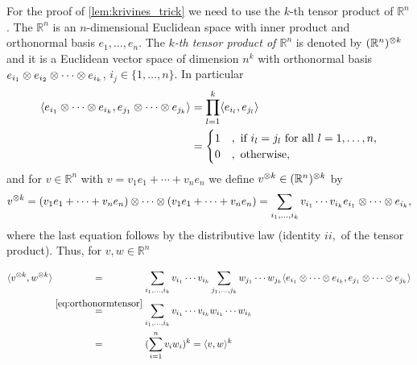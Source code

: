 \noindent For the proof of \ref{lem:krivines_trick} we need to use the $k$-th tensor product of $\mathbb{R}^n$. The $\mathbb{R}^n$ is an $n$-dimensional Euclidean space with inner product \sclr{\cdot}{\cdot} and orthonormal basis $e_1,\dots,e_n$. The \emph{$k$-th tensor product of $\mathbb{R}^n$} is denoted by $(\mathbb{R}^n)^{\otimes k}$ and it is a Euclidean  vector space of dimension $n^k$ with orthonormal basis $e_{i_1}\otimes e_{i_2} \otimes \cdots \otimes e_{i_k}$, $i_j\in\{1,\dots,n\}$. In particular
\begin{align}
	\langle{e_{i_1}\ensuremath{\otimes}\cdots \ensuremath{\otimes}e_{i_k}},{e_{j_1}\otimes \cdots \otimes e_{j_k}}\rangle
	&= \prod_{l=1}^k \langle{e_{i_l}},{e_{j_l}}\rangle\nonumber\\
	&=\begin{cases}
		1 & , \text{ if } i_l=j_l \text{ for all } l=1,\dots,n,\\
		0 & , \text{ otherwise},
	\end{cases} \label{eq:orthonormtensor}
\end{align}
and for $v\in\mathbb{R}^n$ with $v=v_1e_1+\cdots +v_ne_n$ we define $v^{\otimes k} \in (\mathbb{R}^n)^{\otimes k}$ by 
\begin{equation}
	v^{\otimes k} = (v_1e_1 + \cdots + v_ne_n) \otimes \cdots \otimes (v_1e_1 + \cdots + v_ne_n) = \sum_{i_1,\dots,i_k} v_{i_1}\cdots v_{i_k} e_{i_1}\otimes\cdots\otimes e_{i_k},
\end{equation}
where the last equation follows by the distributive law (identity $ii,$ of the tensor product). 
Thus, for $v,w\in\mathbb{R}^n$ 
\begin{align}
	\sclr{v^{\tensor k}}{w^{\tensor k}}
	&\overset{\textcolor{white}{\eqref*{eq:orthonormtensor}}}{=} \sum_{i_1,\dots,i_k} v_{i_1}\cdots v_{i_k} \sum_{j_1,\dots,j_k} w_{j_1}\cdots w_{j_k} \sclr{e_{i_1}\tensor\cdots\tensor e_{i_k}}{e_{j_1}\tensor\cdots\tensor e_{j_k}} \nonumber\\
	&\overset{\eqref{eq:orthonormtensor}}{=} \sum_{i_1,\dots,i_k} v_{i_1}\cdots v_{i_k}w_{i_1}\cdots w_{i_k} \nonumber\\
	&\overset{\textcolor{white}{\eqref*{eq:orthonormtensor}}}{=}(\sum_{i=1}^n v_iw_i)^k = \sclr{v}{w}^k \label{eq:kth_tensor}
\end{align}
